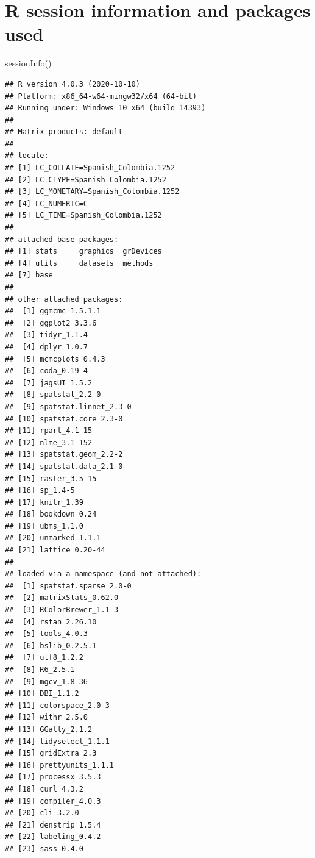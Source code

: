 \documentclass[
]{book}
\newenvironment{Shaded}{\begin{snugshade}}{\end{snugshade}}
\newcommand{\FunctionTok}[1]{\textcolor[rgb]{0.00,0.00,0.00}{#1}}
\newcommand{\NormalTok}[1]{#1}
\begin{document}
\hypertarget{r-session-information-and-packages-used}{%
\chapter{R session information and packages used}\label{r-session-information-and-packages-used}}

\begin{Shaded}
\begin{Highlighting}[]
\FunctionTok{sessionInfo}\NormalTok{()}
\end{Highlighting}
\end{Shaded}

\begin{verbatim}
## R version 4.0.3 (2020-10-10)
## Platform: x86_64-w64-mingw32/x64 (64-bit)
## Running under: Windows 10 x64 (build 14393)
## 
## Matrix products: default
## 
## locale:
## [1] LC_COLLATE=Spanish_Colombia.1252 
## [2] LC_CTYPE=Spanish_Colombia.1252   
## [3] LC_MONETARY=Spanish_Colombia.1252
## [4] LC_NUMERIC=C                     
## [5] LC_TIME=Spanish_Colombia.1252    
## 
## attached base packages:
## [1] stats     graphics  grDevices
## [4] utils     datasets  methods  
## [7] base     
## 
## other attached packages:
##  [1] ggmcmc_1.5.1.1       
##  [2] ggplot2_3.3.6        
##  [3] tidyr_1.1.4          
##  [4] dplyr_1.0.7          
##  [5] mcmcplots_0.4.3      
##  [6] coda_0.19-4          
##  [7] jagsUI_1.5.2         
##  [8] spatstat_2.2-0       
##  [9] spatstat.linnet_2.3-0
## [10] spatstat.core_2.3-0  
## [11] rpart_4.1-15         
## [12] nlme_3.1-152         
## [13] spatstat.geom_2.2-2  
## [14] spatstat.data_2.1-0  
## [15] raster_3.5-15        
## [16] sp_1.4-5             
## [17] knitr_1.39           
## [18] bookdown_0.24        
## [19] ubms_1.1.0           
## [20] unmarked_1.1.1       
## [21] lattice_0.20-44      
## 
## loaded via a namespace (and not attached):
##  [1] spatstat.sparse_2.0-0
##  [2] matrixStats_0.62.0   
##  [3] RColorBrewer_1.1-3   
##  [4] rstan_2.26.10        
##  [5] tools_4.0.3          
##  [6] bslib_0.2.5.1        
##  [7] utf8_1.2.2           
##  [8] R6_2.5.1             
##  [9] mgcv_1.8-36          
## [10] DBI_1.1.2            
## [11] colorspace_2.0-3     
## [12] withr_2.5.0          
## [13] GGally_2.1.2         
## [14] tidyselect_1.1.1     
## [15] gridExtra_2.3        
## [16] prettyunits_1.1.1    
## [17] processx_3.5.3       
## [18] curl_4.3.2           
## [19] compiler_4.0.3       
## [20] cli_3.2.0            
## [21] denstrip_1.5.4       
## [22] labeling_0.4.2       
## [23] sass_0.4.0           

\end{verbatim}
\end{document}
